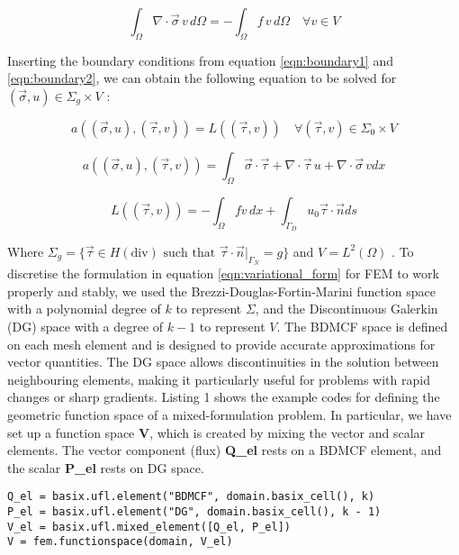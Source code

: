 \begin{equation}
\int_{\Omega} \nabla \cdot \vec{\sigma} \, v \, d\Omega = - \int_{\Omega} f \, v \, d\Omega \quad \forall v \in V
\end{equation}

Inserting the boundary conditions from equation \ref{eqn:boundary1} and \ref{eqn:boundary2}, we can obtain the following equation to be solved for $(\vec{\sigma}, u) \in \Sigma_g \times V$ \cite{dolfinxtutorial2023}:

\begin{equation}
    a((\vec{\sigma},u),(\vec{\tau},v)) = L((\vec{\tau},v)) \quad \forall (\vec{\tau},v) \in \Sigma_0 \times V
    \label{eqn:variational_form}
\end{equation}

\begin{equation}
    a((\vec{\sigma},u),(\vec{\tau},v)) = \int_{\Omega} \vec{\sigma} \cdot\vec{\tau} + \nabla \cdot \vec{\tau} \, u + \nabla \cdot \vec{\sigma} \, v  dx 
    \label{eqn:vatiational_form_a}
\end{equation}

\begin{equation}
    L((\vec{\tau},v)) = -\int_{\Omega} f v \, dx + \int_{\Gamma_{D}} u_0 \vec{\tau} \cdot \vec{n}  ds
    \label{eqn:vatiational_form_L}
\end{equation}

Where $\Sigma_g = \{\vec{\tau} \in H(\text{div}) \text{ such that } \vec{\tau} \cdot \vec{n}|_{\Gamma_N} = g\}$ and $V = L^2(\Omega)$ \cite{dolfinxtutorial2023}. To discretise the formulation in equation \ref{eqn:variational_form} for FEM to work properly and stably, we used the  Brezzi-Douglas-Fortin-Marini function space with a polynomial degree of $k$ to represent $\Sigma$, and the Discontinuous Galerkin (DG) space with a degree of $k-1$ to represent $V$. The BDMCF space is defined on each mesh element and is designed to provide accurate approximations for vector quantities. The DG space allows discontinuities in the solution between neighbouring elements, making it particularly useful for problems with rapid changes or sharp gradients.  Listing 1 shows the example codes for defining the geometric function space of a mixed-formulation problem. In particular, we have set up a function space \textbf{V}, which is created by mixing the vector and scalar elements. The vector component (flux) \textbf{Q\_el} rests on a BDMCF element, and the scalar \textbf{P\_el} rests on DG space. 

\begin{lstlisting}[frame=single, caption={Defining geometric parameters / Creating function space }]
Q_el = basix.ufl.element("BDMCF", domain.basix_cell(), k)
P_el = basix.ufl.element("DG", domain.basix_cell(), k - 1)
V_el = basix.ufl.mixed_element([Q_el, P_el])
V = fem.functionspace(domain, V_el)
\end{lstlisting}

